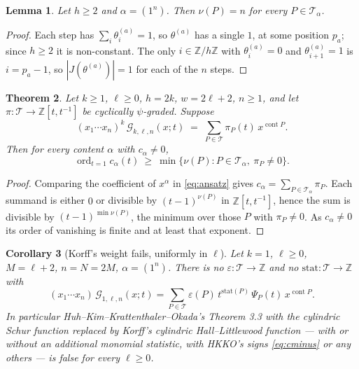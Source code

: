 \documentclass[11pt]{article}
\newtheorem{theorem}{Theorem}
\newtheorem{lemma}[theorem]{Lemma}
\newtheorem{corollary}[theorem]{Corollary}
\theoremstyle{definition}
\DeclareMathOperator{\cont}{cont}
\DeclareMathOperator{\ord}{ord}
\newcommand{\Z}{\mathbb{Z}}
\newcommand{\T}{\mathcal{T}}
\begin{document}
\begin{lemma}\label{lem:nu}
Let $h\ge2$ and $\alpha=(1^{n})$. Then $\nu(P)=n$ for every $P\in\T_\alpha$.
\end{lemma}

\begin{proof}
Each step has $\sum_i\theta^{(a)}_i=1$, so $\theta^{(a)}$ has a single $1$, at
some position $p_a$; since $h\ge2$ it is non-constant. The only $i\in\Z/h\Z$
with $\theta^{(a)}_i=0$ and $\theta^{(a)}_{i+1}=1$ is $i=p_a-1$, so
$|J(\theta^{(a)})|=1$ for each of the $n$ steps.
\end{proof}

\begin{theorem}\label{thm:main}
Let $k\ge1$, $\ell\ge0$, $h=2k$, $w=2\ell+2$, $n\ge1$, and let
$\pi:\T\to\Z[t,t^{-1}]$ be cyclically $\psi$-graded. Suppose
\begin{equation}\label{eq:ansatz}
 (x_1\cdots x_n)^{k}\,\mathcal G_{k,\ell,n}(x;t)
 \;=\;\sum_{P\in\T}\pi_P(t)\,x^{\cont P}.
\end{equation}
Then for every content $\alpha$ with $c_\alpha\ne0$,
\[
  \ord_{t=1}c_\alpha(t)\ \ge\ \min\{\nu(P):P\in\T_\alpha,\ \pi_P\ne0\}.
\]
\end{theorem}

\begin{proof}
Comparing the coefficient of $x^{\alpha}$ in \eqref{eq:ansatz} gives
$c_\alpha=\sum_{P\in\T_\alpha}\pi_P$. Each summand is either $0$ or divisible by
$(t-1)^{\nu(P)}$ in $\Z[t,t^{-1}]$, hence the sum is divisible by
$(t-1)^{\min\nu(P)}$, the minimum over those $P$ with $\pi_P\ne0$. As
$c_\alpha\ne0$ its order of vanishing is finite and at least that exponent.
\end{proof}

\begin{corollary}[Korff's weight fails, uniformly in $\ell$]\label{cor:main}
Let $k=1$, $\ell\ge0$, $M=\ell+2$, $n=N=2M$, $\alpha=(1^{n})$. There is no
$\varepsilon:\T\to\Z$ and no $\mathrm{stat}:\T\to\Z$ with
\[
 (x_1\cdots x_n)\,\mathcal G_{1,\ell,n}(x;t)
 =\sum_{P\in\T}\varepsilon(P)\,t^{\mathrm{stat}(P)}\,\Psi_P(t)\,x^{\cont P}.
\]
In particular Huh--Kim--Krattenthaler--Okada's Theorem 3.3 with the cylindric
Schur function replaced by Korff's cylindric Hall--Littlewood function --- with
or without an additional monomial statistic, with HKKO's signs
\eqref{eq:cminus} or any others --- is false for every $\ell\ge0$.
\end{corollary}
\end{document}
